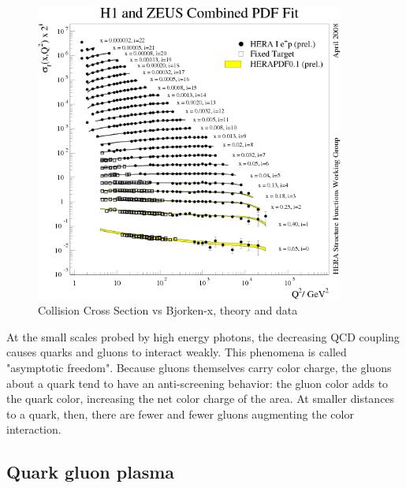 \begin{figure}[h!]
\begin{centering}
\includegraphics[width=4in]{Chapter1/importfigs/scholarpedia_bjorken_x_qcdExp.png}
\par\end{centering}
\caption{Collision Cross Section vs Bjorken-x, theory and data \cite{Shimizu:2009fc} \label{fig:qcdBjorkenX}}
\end{figure}

At the small scales probed by high energy photons, the decreasing QCD coupling causes quarks and gluons to interact weakly. This phenomena is called "asymptotic freedom". Because gluons themselves carry color charge, the gluons about a quark tend to have an anti-screening behavior: the gluon color adds to the quark color, increasing the net color charge of the area. At smaller distances to a quark, then, there are fewer and fewer gluons augmenting the color interaction.

\subsection{Quark gluon plasma}


